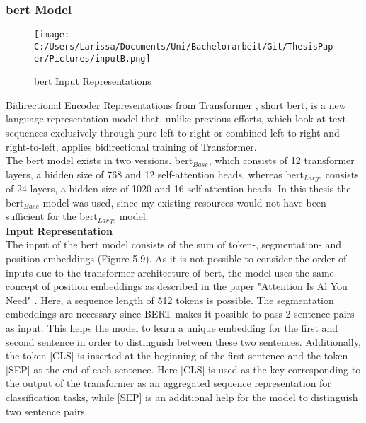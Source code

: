 \documentclass[a4paper, 11pt,titlepage,oneside,openany]{book}
\begin{document}
\subsubsection{\gls{bert} Model}
\begin{figure}[h]
	\centering
	\texttt{[image: C:/Users/Larissa/Documents/Uni/Bachelorarbeit/Git/ThesisPaper/Pictures/inputB.png]}
	\caption{\gls{bert} Input Representations \cite{bert}}
\end{figure}
Bidirectional Encoder Representations from Transformer \cite{bert}, short \gls{bert}, is a new language representation model that, unlike previous efforts, which look at text sequences exclusively through pure left-to-right or combined left-to-right and right-to-left, applies bidirectional training of Transformer. \\
\noindent The \gls{bert} model exists in two versions. \gls{bert}$_{Base}$, which consists of 12 transformer layers, a hidden size of 768 and 12 self-attention heads, whereas \gls{bert}$_{Large}$ consists of 24 layers, a hidden size of 1020 and 16 self-attention heads. In this thesis the \gls{bert}$_{Base}$ model was used, since my existing resources would not have been sufficient for the \gls{bert}$_{Large}$ model.\\

\noindent \textbf{Input Representation} \\
The input of the \gls{bert} model consists of the sum of token-, segmentation- and position embeddings (Figure 5.9). As it is not possible to consider the order of inputs due to the transformer architecture of \gls{bert}, the model uses the same concept of position embeddings as described in the paper "Attention Is Al You Need" \cite{attention}. Here, a sequence length of 512 tokens is possible. The segmentation embeddings are necessary since BERT makes it possible to pass 2 sentence pairs as input. This helps the model to learn a unique embedding for the first and second sentence in order to distinguish between these two sentences.  Additionally, the token [CLS] is inserted at the beginning of the first sentence and the token [SEP] at the end of each sentence. Here [CLS] is used as the key corresponding to the output of the transformer as an aggregated sequence representation for classification tasks, while [SEP] is an additional help for the model to distinguish two sentence pairs.\\
\end{document}
